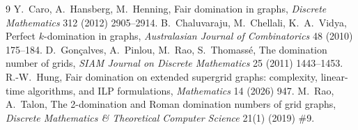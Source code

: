 \documentclass[11pt]{ltjsarticle}
\theoremstyle{definition}
\begin{document}
\begin{thebibliography}{9}
 Y.~Caro, A.~Hansberg, M.~Henning, Fair domination in graphs, \emph{Discrete Mathematics} 312 (2012) 2905--2914.
 B.~Chaluvaraju, M.~Chellali, K.~A.~Vidya, Perfect $k$-domination in graphs, \emph{Australasian Journal of Combinatorics} 48 (2010) 175--184.
 D.~Gon\c{c}alves, A.~Pinlou, M.~Rao, S.~Thomass\'e, The domination number of grids, \emph{SIAM Journal on Discrete Mathematics} 25 (2011) 1443--1453.
 R.-W.~Hung, Fair domination on extended supergrid graphs: complexity, linear-time algorithms, and ILP formulations, \emph{Mathematics} 14 (2026) 947.
 M.~Rao, A.~Talon, The 2-domination and Roman domination numbers of grid graphs, \emph{Discrete Mathematics \& Theoretical Computer Science} 21(1) (2019) \#9.
\end{thebibliography}
\end{document}
